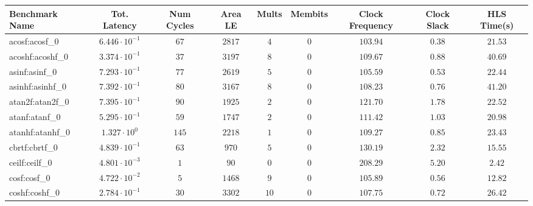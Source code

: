 \begin{tabular}{|l|c|c|c|c|c|c|c|c|}
\hline
Benchmark Name               & Tot. Latency            & Num Cycles & Area LE   & Mults   & Membits & Clock Frequency & Clock Slack & HLS Time(s) \\
\hline
acosf:acosf\_0               & $ 6.446 \cdot 10^{-1} $ & $ 67     $ & $ 2817  $ & $ 4   $ & $ 0   $ & $ 103.94      $ & $ 0.38    $ & $ 21.53   $ \\
acoshf:acoshf\_0             & $ 3.374 \cdot 10^{-1} $ & $ 37     $ & $ 3197  $ & $ 8   $ & $ 0   $ & $ 109.67      $ & $ 0.88    $ & $ 40.69   $ \\
asinf:asinf\_0               & $ 7.293 \cdot 10^{-1} $ & $ 77     $ & $ 2619  $ & $ 5   $ & $ 0   $ & $ 105.59      $ & $ 0.53    $ & $ 22.44   $ \\
asinhf:asinhf\_0             & $ 7.392 \cdot 10^{-1} $ & $ 80     $ & $ 3167  $ & $ 8   $ & $ 0   $ & $ 108.23      $ & $ 0.76    $ & $ 41.20   $ \\
atan2f:atan2f\_0             & $ 7.395 \cdot 10^{-1} $ & $ 90     $ & $ 1925  $ & $ 2   $ & $ 0   $ & $ 121.70      $ & $ 1.78    $ & $ 22.52   $ \\
atanf:atanf\_0               & $ 5.295 \cdot 10^{-1} $ & $ 59     $ & $ 1747  $ & $ 2   $ & $ 0   $ & $ 111.42      $ & $ 1.03    $ & $ 20.98   $ \\
atanhf:atanhf\_0             & $ 1.327 \cdot 10^{0}  $ & $ 145    $ & $ 2218  $ & $ 1   $ & $ 0   $ & $ 109.27      $ & $ 0.85    $ & $ 23.43   $ \\
cbrtf:cbrtf\_0               & $ 4.839 \cdot 10^{-1} $ & $ 63     $ & $ 970   $ & $ 5   $ & $ 0   $ & $ 130.19      $ & $ 2.32    $ & $ 15.55   $ \\
ceilf:ceilf\_0               & $ 4.801 \cdot 10^{-3} $ & $ 1      $ & $ 90    $ & $ 0   $ & $ 0   $ & $ 208.29      $ & $ 5.20    $ & $ 2.42    $ \\
cosf:cosf\_0                 & $ 4.722 \cdot 10^{-2} $ & $ 5      $ & $ 1468  $ & $ 9   $ & $ 0   $ & $ 105.89      $ & $ 0.56    $ & $ 12.82   $ \\
coshf:coshf\_0               & $ 2.784 \cdot 10^{-1} $ & $ 30     $ & $ 3302  $ & $ 10  $ & $ 0   $ & $ 107.75      $ & $ 0.72    $ & $ 26.42   $ \\

\end{tabular}
